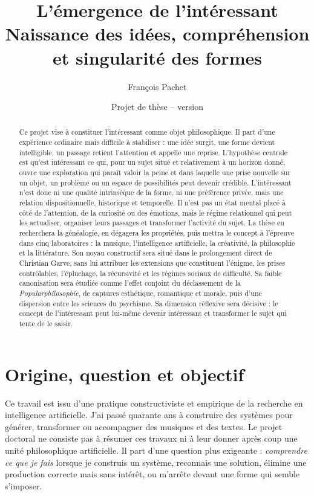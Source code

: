 \documentclass[11pt,a4paper]{article}
\title{L'émergence de l'intéressant\\
\large Naissance des idées, compréhension et singularité des formes}
\author{François Pachet}
\date{Projet de thèse -- version \projectversion\\\small \projectdate}
\begin{document}
\maketitle

\begin{abstract}
Ce projet vise à constituer l'intéressant comme objet philosophique. Il part
d'une expérience ordinaire mais difficile à stabiliser : une idée surgit, une
forme devient intelligible, un passage retient l'attention et appelle une
reprise. L'hypothèse centrale est qu'est intéressant ce qui, pour un sujet situé
et relativement à un horizon donné, ouvre une exploration qui paraît valoir la
peine et dans laquelle une prise nouvelle sur un objet, un problème ou un espace
de possibilités peut devenir crédible. L'intéressant n'est donc ni une qualité intrinsèque de la forme,
ni une préférence privée, mais une relation dispositionnelle, historique et
temporelle. Il n'est pas un état mental placé à côté de l'attention, de la
curiosité ou des émotions, mais le régime relationnel qui peut les actualiser,
organiser leurs passages et transformer l'activité du sujet. La thèse en
recherchera la généalogie, en dégagera les propriétés,
puis mettra le concept à l'épreuve dans cinq laboratoires : la musique,
l'intelligence artificielle, la créativité, la philosophie et la littérature.
Son noyau constructif sera situé dans le prolongement direct de Christian
Garve, sans lui attribuer les extensions que constituent l'énigme, les prises
contrôlables, l'épluchage, la récursivité et les régimes sociaux de difficulté.
Sa faible canonisation sera étudiée comme l'effet conjoint du déclassement de la
\emph{Popularphilosophie}, de captures esthétique, romantique et morale, puis
d'une dispersion entre les sciences du psychisme.
Sa dimension réflexive sera décisive : le concept de l'intéressant peut
lui-même devenir intéressant et transformer le sujet qui tente de le saisir.
\end{abstract}

\section{Origine, question et objectif}

Ce travail est issu d'une pratique constructiviste et empirique de la recherche
en intelligence artificielle. J'ai passé quarante ans à construire des systèmes
pour générer, transformer ou accompagner des musiques et des textes. Le projet
doctoral ne consiste pas à résumer ces travaux ni à leur donner après coup une
unité philosophique artificielle. Il part d'une question plus exigeante :
\emph{comprendre ce que je fais} lorsque je construis un système, reconnais une
solution, élimine une production correcte mais sans intérêt, ou m'arrête devant
une forme qui semble s'imposer.
\end{document}
